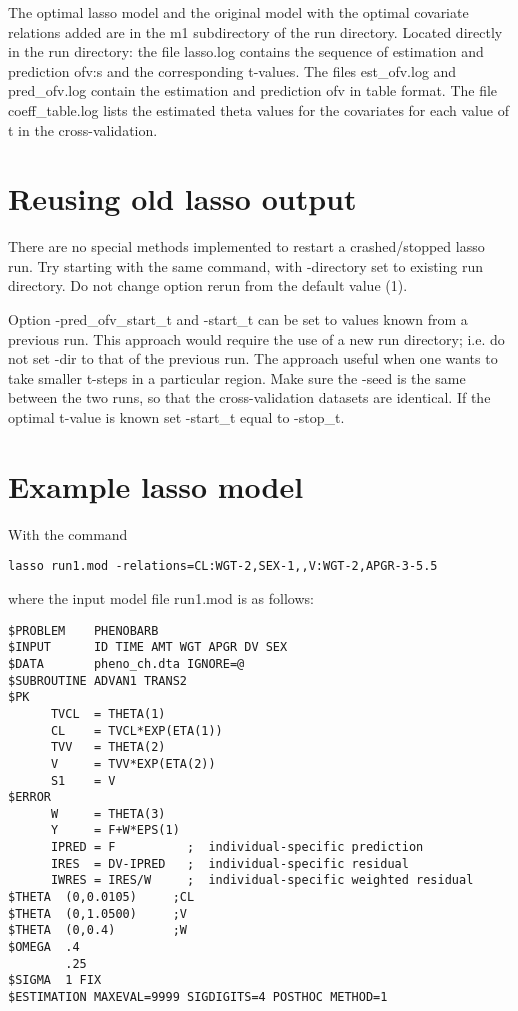 The optimal lasso model and the original model with the optimal covariate relations added are in the m1 subdirectory of the run directory. Located directly in the run directory: the file lasso.log contains the sequence of estimation and prediction ofv:s and the corresponding t-values. The files est\_ofv.log and pred\_ofv.log contain the estimation and prediction ofv in table format. The file coeff\_table.log lists the estimated theta values for the covariates for each value of t in the cross-validation.

\section{Reusing old lasso output}

There are no special methods implemented to restart a crashed/stopped lasso run. Try starting with the same command, with -directory set to existing run directory. Do not change option rerun from the default value (1).

Option -pred\_ofv\_start\_t and -start\_t can be set to values known from a previous run. This approach would require the use of a new run directory; i.e. do not set -dir to that of the previous run. The approach useful when one wants to take smaller t-steps in a particular region. Make sure the -seed is the same between the two runs, so that the cross-validation datasets are identical. If the optimal t-value is known set -start\_t equal to -stop\_t. 

\section{Example lasso model}

With the command
\begin{verbatim}
lasso run1.mod -relations=CL:WGT-2,SEX-1,,V:WGT-2,APGR-3-5.5
\end{verbatim}

where the input model file run1.mod is as follows:

\begin{verbatim}
$PROBLEM    PHENOBARB 
$INPUT      ID TIME AMT WGT APGR DV SEX
$DATA       pheno_ch.dta IGNORE=@
$SUBROUTINE ADVAN1 TRANS2
$PK
      TVCL  = THETA(1)
      CL    = TVCL*EXP(ETA(1))
      TVV   = THETA(2)
      V     = TVV*EXP(ETA(2))
      S1    = V
$ERROR      
      W     = THETA(3)
      Y     = F+W*EPS(1)
      IPRED = F          ;  individual-specific prediction
      IRES  = DV-IPRED   ;  individual-specific residual
      IWRES = IRES/W     ;  individual-specific weighted residual
$THETA  (0,0.0105)     ;CL
$THETA  (0,1.0500)     ;V
$THETA  (0,0.4)        ;W
$OMEGA  .4
        .25
$SIGMA  1 FIX
$ESTIMATION MAXEVAL=9999 SIGDIGITS=4 POSTHOC METHOD=1
\end{verbatim}

